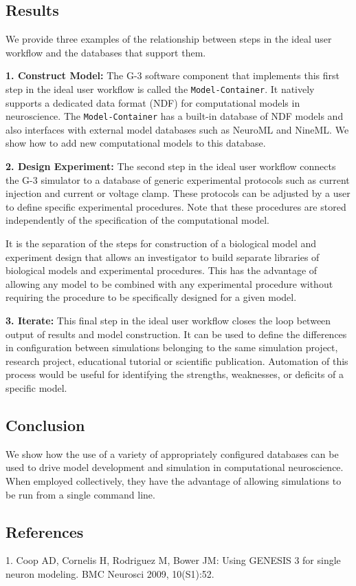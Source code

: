 \documentclass[12pt]{article}
\begin{document}
\subsection*{Results}

We provide three examples of the relationship between steps in the ideal user workflow and the databases that support them.

{\bf 1. Construct Model:} The G-3 software component that implements this first step in the ideal
user workflow is called the {\tt Model-Container}.  It
natively supports a dedicated data format (NDF) for computational models in neuroscience.  The {\tt Model-Container} has a built-in database of NDF models and also interfaces with  external model databases such as NeuroML and NineML.  We
show how to add new computational models to this database.

{\bf 2. Design Experiment:} The second step in the ideal user workflow connects the G-3 simulator
to a database of generic experimental protocols such as current injection and current or voltage
clamp.  These protocols can be adjusted by a user to define specific experimental procedures. 
Note that these procedures are stored independently of the specification
of the computational model.

It is the separation of the steps for construction of a biological model and
experiment design that allows an investigator to build separate libraries of
biological models and experimental procedures.  This has the advantage of
allowing any model to be combined with any experimental
procedure without requiring the procedure to be specifically designed for a given model.  

{\bf 3. Iterate:} This final step in the ideal user workflow closes the loop between output of results and model construction.
It can be used to define the differences in configuration between simulations belonging to the same simulation
project, research project, educational tutorial or scientific publication. Automation of this process would be
useful for identifying the strengths, weaknesses, or deficits of a specific model.

\subsection*{Conclusion}

We show how the use of a variety of appropriately configured
databases can be used to drive model development and simulation in computational neuroscience.
When employed collectively, they have the advantage of allowing simulations
to be run from a single command line.

\subsection*{References}
1. Coop AD, Cornelis H, Rodriguez M, Bower JM: Using GENESIS 3 for single neuron modeling. BMC Neurosci 2009, 10(S1):52.
\end{document}
